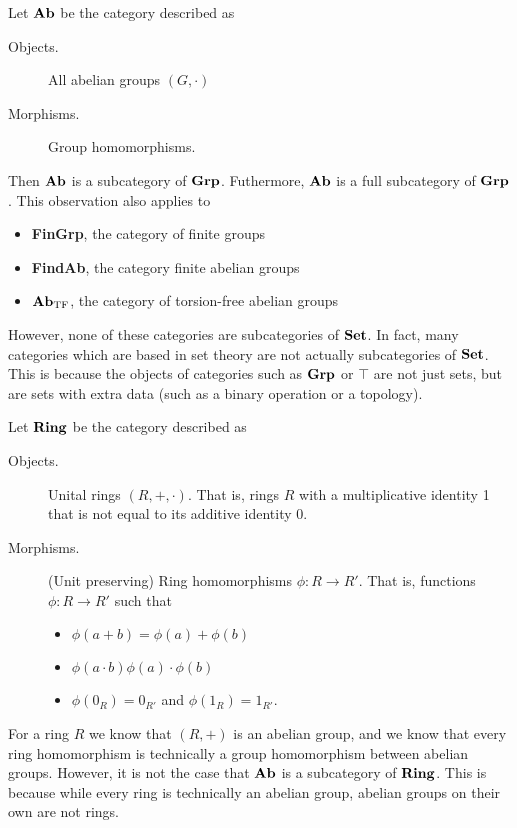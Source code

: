     \begin{example}
        Let $\operatorname{\mathbf{Ab}}$ be the category described as 
        \begin{description}
            \item[Objects.] All abelian groups $(G, \cdot)$
            \item[Morphisms.] Group homomorphisms.  
        \end{description}
        Then $\operatorname{\mathbf{Ab}}$ is a subcategory of $\operatorname{\mathbf{Grp}}$. Futhermore, $\operatorname{\mathbf{Ab}}$ 
        is a full subcategory of $\operatorname{\mathbf{Grp}}$. This observation also applies to 
        \begin{itemize}
            \item \textbf{FinGrp}, the category of finite groups 
            \item \textbf{FindAb}, the category finite abelian groups
            \item $\operatorname{\mathbf{Ab}}_{\text{TF}}$, the category of torsion-free abelian groups 
        \end{itemize}

        However, none of these categories are subcategories of $\operatorname{\mathbf{Set}}$. In fact, 
        many categories which are based in set theory are not actually subcategories 
        of $\operatorname{\mathbf{Set}}$. This is because the objects of categories such as $\operatorname{\mathbf{Grp}}$ or $\top$
        are not just sets, but are sets with extra data (such as a binary operation or a topology).  

    \end{example}

    \begin{example}
        Let $\operatorname{\mathbf{Ring}}$ be the category described as 
        \begin{description}
            \item[Objects.] Unital rings $(R, +, \cdot)$. That is, rings $R$ with a multiplicative identity 1 that is not 
            equal to its additive identity 0. 
            \item[Morphisms.] (Unit preserving) Ring homomorphisms $\phi: R \to R'$. 
            That is, functions $\phi: R \to R'$ such that 
            \begin{itemize}
                \item $\phi(a + b) = \phi(a) + \phi(b)$
                \item $\phi(a \cdot b) \phi(a) \cdot \phi(b)$ 
                \item $\phi(0_R) = 0_{R'}$ and $\phi(1_R) = 1_{R'}$.
            \end{itemize} 
        \end{description}
        For a ring $R$ we know that $(R, +)$ is an abelian group, and we know that 
        every ring homomorphism is technically a group homomorphism between abelian groups.
        However, it is not 
        the case that $\operatorname{\mathbf{Ab}}$ is a subcategory of $\operatorname{\mathbf{Ring}}$. This is because while 
        every ring is technically an abelian group, abelian groups on their own are not rings. 
    \end{example}


